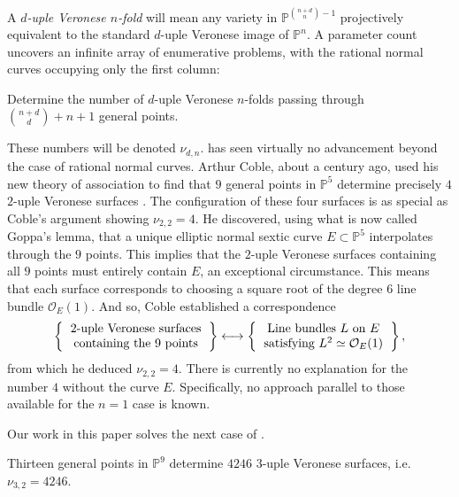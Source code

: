 \documentclass{article}
\renewcommand{\P}{\mathbb{P}}
\renewcommand{\O}{\mathcal{O}}
\begin{document}
A {\sl $d$-uple Veronese $n$-fold} will mean any
variety in $\P^{{n+d \choose n}-1}$ projectively equivalent to the
standard $d$-uple Veronese image of $\P^n$. A parameter count 
uncovers an infinite array of enumerative problems, with the rational normal curves occupying only the first column: 
\begin{problem}
    \label{problem:main}
Determine the number of $d$-uple Veronese $n$-folds passing through ${n+d \choose d}+n+1$ general points.
\end{problem}
These numbers will be denoted $\nu_{d,n}$.   has seen virtually no advancement beyond the case of rational normal curves.  Arthur Coble, about a century ago, used his new theory of association to find that $9$ general points in $\P^5$ determine precisely $4$ $2$-uple Veronese surfaces \cite[~Theorem 19]{CobleAssociatedSO}.  The configuration of these four surfaces is as special as Coble's argument showing $\nu_{2,2}=4$. He discovered, using what is now called Goppa's lemma, that a unique elliptic normal sextic curve $E \subset \P^{5}$ interpolates through the $9$ points. This implies that the $2$-uple Veronese surfaces containing all $9$ points must entirely contain $E$, an exceptional circumstance. This means that each surface corresponds to choosing a square root of the degree $6$ line bundle $\O_{E}(1)$.  And so, Coble established a correspondence 
\begin{align}
\label{Coblecorrespondence}
\left\{ \begin{tabular}{c}
    \text{$2$-uple Veronese surfaces} \\
     \text{containing the 9 points} 
\end{tabular} \right\} \longleftrightarrow \left\{ \begin{tabular}{c}
    \text{Line bundles $L$ on $E$} \\
     \text{satisfying $L^{2} \simeq \O_{E}(1)$} 
\end{tabular} \right\},\end{align}  from which he  deduced $\nu_{2,2}=4$. 
There is currently no explanation for the number $4$ without the curve $E$. Specifically, no approach parallel to those available for the $n=1$ case is known.

 Our work in this paper solves the next case of . 

\begin{theorem}
\label{theorem:main}  Thirteen general points in $\P^{9}$ determine $4246$ $3$-uple Veronese surfaces, i.e. $\nu_{3,2} = 4246$.
\end{theorem}
\end{document}
